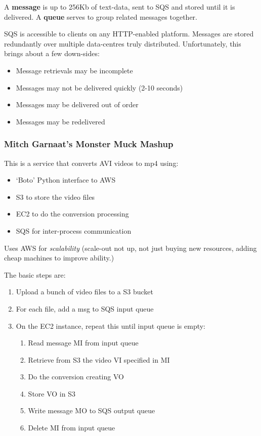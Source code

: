\documentclass[11pt,a4paper,titlepage,dvipsnames,cmyk]{scrartcl}
\begin{document}
A \textbf{message} is up to 256Kb of text-data, sent to SQS and stored until it is delivered. A \textbf{queue} serves to group related messages together.

SQS is accessible to clients on any HTTP-enabled platform. Messages are stored redundantly over multiple data-centres truly distributed. Unfortunately, this brings about a few down-sides:
\begin{itemize}
    \item Message retrievals may be incomplete
    \item Messages may not be delivered quickly (2-10 seconds)
    \item Messages may be delivered out of order
    \item Messages may be redelivered
\end{itemize}

\subsubsection{Mitch Garnaat's Monster Muck Mashup}
This is a service that converts AVI videos to mp4 using:
\begin{itemize}
    \item `Boto' Python interface to AWS
    \item S3 to store the video files
    \item EC2 to do the conversion processing
    \item SQS for inter-process communication
\end{itemize}

Uses AWS for \textit{scalability} (scale-out not up, not just buying new resources, adding cheap machines to improve ability.)

The basic steps are:
\begin{enumerate}
\item Upload a bunch of video files to a S3 bucket
\item For each file, add a msg to SQS input queue
\item On the EC2 instance, repeat this until input queue is empty:
\begin{enumerate}
    \item Read message MI from input queue
    \item Retrieve from S3 the video VI specified in MI
    \item Do the conversion creating VO
    \item Store VO in S3
    \item Write message MO to SQS output queue
    \item Delete MI from input queue
\end{enumerate}
\end{enumerate}
\end{document}

